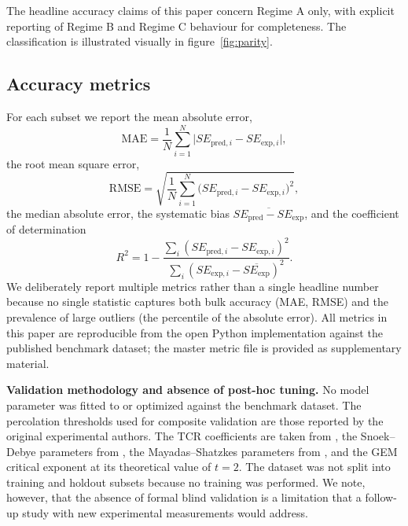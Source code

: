 \documentclass[review,3p,authoryear]{elsarticle}
\begin{document}
The headline accuracy claims of this paper concern Regime A only, with explicit reporting of Regime B and Regime C behaviour for completeness. The classification is illustrated visually in figure~\ref{fig:parity}.

\subsection{Accuracy metrics}

For each subset we report the mean absolute error,
\begin{equation}
\mathrm{MAE} = \frac{1}{N}\sum_{i=1}^{N}\bigl|SE_{\mathrm{pred},i} - SE_{\mathrm{exp},i}\bigr|,
\label{eq:mae}
\end{equation}
the root mean square error,
\begin{equation}
\mathrm{RMSE} = \sqrt{\frac{1}{N}\sum_{i=1}^{N}\bigl(SE_{\mathrm{pred},i} - SE_{\mathrm{exp},i}\bigr)^2},
\label{eq:rmse}
\end{equation}
the median absolute error, the systematic bias $\overline{SE_{\mathrm{pred}} - SE_{\mathrm{exp}}}$, and the coefficient of determination
\begin{equation}
R^2 = 1 - \frac{\sum_i (SE_{\mathrm{pred},i} - SE_{\mathrm{exp},i})^2}{\sum_i (SE_{\mathrm{exp},i} - \overline{SE_{\mathrm{exp}}})^2}.
\label{eq:r2}
\end{equation}
We deliberately report multiple metrics rather than a single headline number because no single statistic captures both bulk accuracy (MAE, RMSE) and the prevalence of large outliers (the  percentile of the absolute error). All metrics in this paper are reproducible from the open Python implementation against the published benchmark dataset; the master metric file is provided as supplementary material.

\textbf{Validation methodology and absence of post-hoc tuning.} No model parameter was fitted to or optimized against the benchmark dataset. The percolation thresholds used for composite validation are those reported by the original experimental authors. The TCR coefficients are taken from \citet{Matula1979}, the Snoek--Debye parameters from \citet{Snoek1948}, the Mayadas--Shatzkes parameters from \citet{Mayadas1970}, and the GEM critical exponent at its theoretical value of $t = 2$. The dataset was not split into training and holdout subsets because no training was performed. We note, however, that the absence of formal blind validation is a limitation that a follow-up study with new experimental measurements would address.
\end{document}
